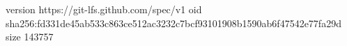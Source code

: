 version https://git-lfs.github.com/spec/v1
oid sha256:fd331de45ab533c863ce512ac3232c7bcf93101908b1590ab6f47542e77fa29d
size 143757
